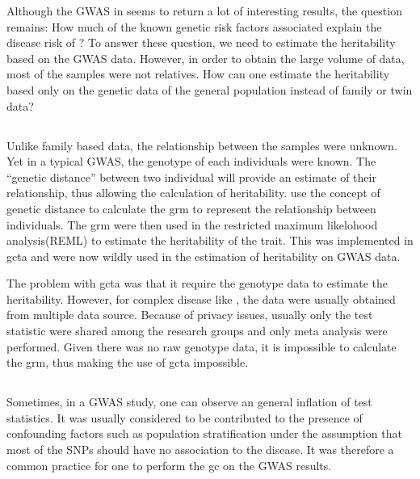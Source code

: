 \documentclass[12pt]{book}
\newcommand*{\glng}{\glsentrylong}
\begin{document}
	Although the \gls{GWAS} in \glng{scz} seems to return a lot of interesting results, the question remains: How much of the known genetic risk factors associated explain the disease risk of \glng{scz}?
	To answer these question, we need to estimate the heritability based on the \gls{GWAS} data. 
	However, in order to obtain the large volume of data, most of the samples were not relatives. 
	How can one estimate the heritability based only on the genetic data of the general population instead of family or twin data?
	
	\subsection{\glng{gcta}}
	Unlike family based data, the relationship between the samples were unknown. 
	Yet in a typical \gls{GWAS}, the genotype of each individuals were known.
	The ``genetic distance'' between two individual will provide an estimate of their relationship, thus allowing the calculation of heritability.
	\citet{Yang2011} use the concept of genetic distance to calculate the \gls{grm} to represent the relationship between individuals.
	The \gls{grm} were then used in the restricted maximum likelohood analysis(REML) to estimate the heritability of the trait\citep{Yang2011}.
	This was implemented in \gls{gcta} and were now wildly used in the estimation of heritability on \gls{GWAS} data.
	
	The problem with \gls{gcta} was that it require the genotype data to estimate the heritability.
	However, for complex disease like \glng{scz}, the data were usually obtained from multiple data source.
	Because of privacy issues, usually only the test statistic were shared among the research groups and only meta analysis were performed.
	Given there was no raw genotype data, it is impossible to calculate the \gls{grm}, thus making the use of \gls{gcta} impossible.
	  
	\subsection{\glng{ldsc}}
	Sometimes, in a \gls{GWAS} study, one can observe an general inflation of test statistics. 
	It was usually considered to be contributed to the presence of confounding factors such as population stratification under the assumption that most of the \glspl{SNP} should have no association to the disease.
	It was therefore a common practice for one to perform the \gls{gc} on the \gls{GWAS} results\citep{Zheng2006}.
	
\end{document}
